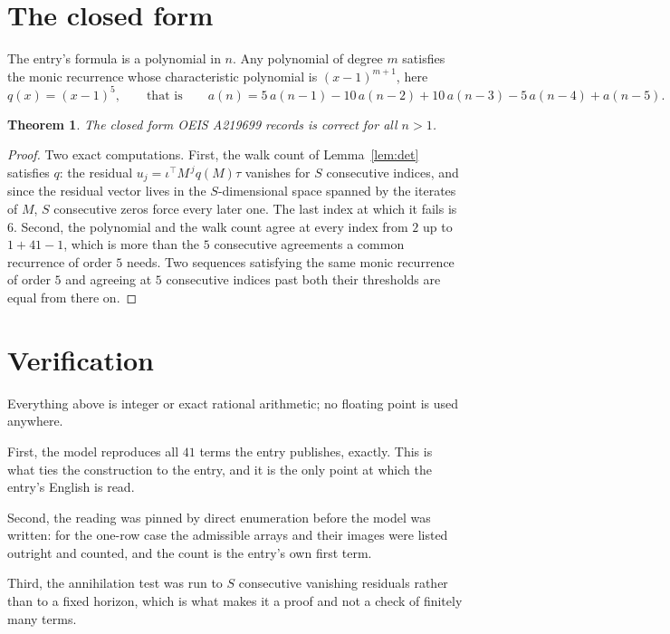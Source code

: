\documentclass[11pt,a4paper]{article}
\theoremstyle{plain}
\newtheorem{theorem}{Theorem}
\theoremstyle{definition}
\begin{document}
\section{The closed form}

The entry's formula is a polynomial in $n$. Any polynomial of degree $m$ satisfies the monic
recurrence whose characteristic polynomial is $(x-1)^{m+1}$, here
\[
q(x)=(x-1)^{5},\qquad\text{that is}\qquad a(n)=5\,a(n-1) - 10\,a(n-2) + 10\,a(n-3) - 5\,a(n-4) + a(n-5).
\]

\begin{theorem}
The closed form OEIS A219699 records is correct for all $n>1$.
\end{theorem}

\begin{proof}
Two exact computations. First, the walk count of Lemma~\ref{lem:det} satisfies $q$: the
residual $u_j=\iota^{\!\top}M^{\,j}q(M)\tau$ vanishes for $S$ consecutive indices, and
since the residual vector lives in the $S$-dimensional space spanned by the iterates of $M$,
$S$ consecutive zeros force every later one. The last index at which it fails is $6$.
Second, the polynomial and the walk count agree at every index from $2$ up to
$1 + 41 - 1$, which is more than the $5$ consecutive agreements a
common recurrence of order $5$ needs. Two sequences satisfying the same monic recurrence
of order $5$ and agreeing at $5$ consecutive indices past both their thresholds are
equal from there on.
\end{proof}

\section{Verification}

Everything above is integer or exact rational arithmetic; no floating point is used anywhere.

First, the model reproduces all $41$ terms the entry publishes, exactly. This is what
ties the construction to the entry, and it is the only point at which the entry's English is
read.

Second, the reading was pinned by direct enumeration before the model was written: for the
one-row case the admissible arrays and their images were listed outright and counted, and the
count is the entry's own first term.

Third, the annihilation test was run to $S$ consecutive vanishing residuals rather than to a
fixed horizon, which is what makes it a proof and not a check of finitely many terms.
\end{document}
